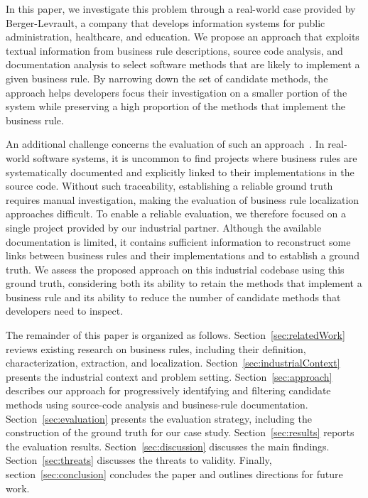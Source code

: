 In this paper, we investigate this problem through a real-world case provided by Berger-Levrault, a company that develops information systems for public administration, healthcare, and education. We propose an approach that exploits textual information from business rule descriptions, source code analysis, and documentation analysis to select software methods that are likely to implement a given business rule. By narrowing down the set of candidate methods, the approach helps developers focus their investigation on a smaller portion of the system while preserving a high proportion of the methods that implement the business rule.

An additional challenge concerns the evaluation of such an approach~\cite{Ayac26a}. In real-world software systems, it is uncommon to find projects where business rules are systematically documented and explicitly linked to their implementations in the source code. Without such traceability, establishing a reliable ground truth requires manual investigation, making the evaluation of business rule localization approaches difficult. To enable a reliable evaluation, we therefore focused on a single project provided by our industrial partner. Although the available documentation is limited, it contains sufficient information to reconstruct some links between business rules and their implementations and to establish a ground truth. We assess the proposed approach on this industrial codebase using this ground truth, considering both its ability to retain the methods that implement a business rule and its ability to reduce the number of candidate methods that developers need to inspect.

The remainder of this paper is organized as follows. Section~\ref{sec:relatedWork} reviews existing research on business rules, including their definition, characterization, extraction, and localization. Section~\ref{sec:industrialContext} presents the industrial context and problem setting. Section~\ref{sec:approach} describes our approach for progressively identifying and filtering candidate methods using source-code analysis and business-rule documentation. Section~\ref{sec:evaluation} presents the evaluation strategy, including the construction of the ground truth for our case study. Section~\ref{sec:results} reports the evaluation results. Section~\ref{sec:discussion} discusses the main findings. Section~\ref{sec:threats} discusses the threats to validity. Finally, section~\ref{sec:conclusion} concludes the paper and outlines directions for future work.